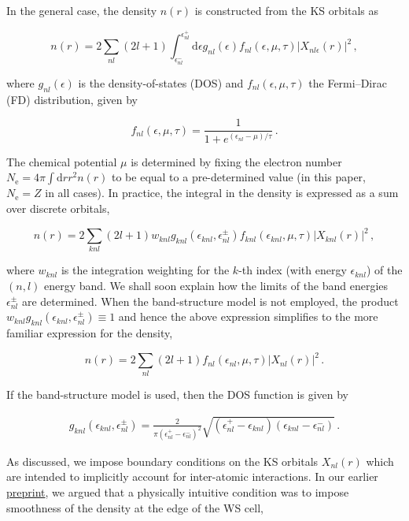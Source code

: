 \documentclass[11pt]{article}
\begin{document}
In the general case, the density \(n(r)\) is constructed from the KS
orbitals as

\begin{equation}
    n(r) = 2\sum_{nl}(2l+1)
    \int_{\epsilon_{nl}^-}^{\epsilon_{nl}^+} \textrm{d}{\epsilon} g_{nl}(\epsilon) f_{nl}(\epsilon,\mu,\tau) |X_{nl\epsilon}(r)|^2\,,
\end{equation}

where \(g_{nl}(\epsilon)\) is the density-of-states (DOS) and
\(f_{nl}(\epsilon,\mu,\tau)\) the Fermi--Dirac (FD) distribution, given
by

\begin{equation}
f_{nl}(\epsilon,\mu,\tau) = \frac{1}{1+e^{(\epsilon_{nl}-\mu)/\tau}}\,.
\end{equation}

The chemical potential \(\mu\) is determined by fixing the electron
number \(N_\textrm{e}=4\pi\int\textrm{d}r r^2 n(r)\) to be equal to a
pre-determined value (in this paper, \(N_\textrm{e}=Z\) in all cases).
In practice, the integral in the density is expressed as a sum over
discrete orbitals,

\begin{equation}
 n(r) = 2\sum_{knl}(2l+1) w_{knl} g_{knl}(\epsilon_{knl},\epsilon_{nl}^\pm) f_{knl}(\epsilon_{knl},\mu,\tau) |X_{knl}(r)|^2\,,
\end{equation}

where \(w_{knl}\) is the integration weighting for the \(k\)-th index
(with energy \(\epsilon_{knl}\)) of the \((n,l)\) energy band. We shall
soon explain how the limits of the band energies \(\epsilon_{nl}^\pm\)
are determined. When the band-structure model is not employed, the
product \(w_{knl} g_{knl}(\epsilon_{knl}, \epsilon_{nl}^\pm)\equiv 1\)
and hence the above expression simplifies to the more familiar
expression for the density,

\begin{equation}
n(r) = 2\sum_{nl}(2l+1) f_{nl}(\epsilon_{nl},\mu,\tau) |X_{nl}(r)|^2\,.
\end{equation}

If the band-structure model is used, then the DOS function is given by

\begin{gather}
g_{knl}(\epsilon_{knl},\epsilon_{nl}^\pm) =\frac{2}{ \pi (\epsilon^+_{nl}-\epsilon_{nl}^-)^2} \sqrt{(\epsilon^+_{nl}-\epsilon_{knl})(\epsilon_{knl} - \epsilon^-_{nl})}\,.
\end{gather}

As discussed, we impose boundary conditions on the KS orbitals
\(X_{nl}(r)\) which are intended to implicitly account for inter-atomic
interactions. In our earlier
\href{https://arxiv.org/abs/2103.09928}{preprint}, we argued that a
physically intuitive condition was to impose smoothness of the density
at the edge of the WS cell,
\end{document}
